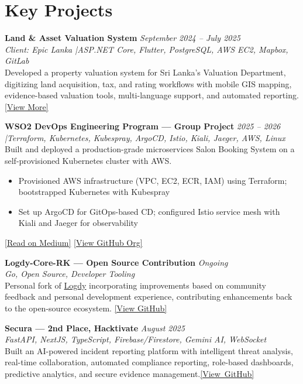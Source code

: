 \documentclass[a4paper,10pt]{article}
\newcommand{\projectsep}{\vspace{4pt}}
\newcommand{\project}[4]{%
  \noindent\textbf{#1} \hfill \textit{#2}\\[-2pt]
  \noindent\textcolor{accentblue}{\textit{#3}}\\[1pt]
  \noindent#4%
}
\begin{document}
\section{Key Projects}
\vspace{2pt}

\project{Land \& Asset Valuation System}{September 2024 -- July 2025}%
{Client: Epic Lanka \quad|\quad ASP.NET Core, Flutter, PostgreSQL, AWS EC2, Mapbox, GitLab}%
{Developed a property valuation system for Sri Lanka's Valuation Department, digitizing land acquisition, tax, and rating workflows with mobile GIS mapping, evidence-based valuation tools, multi-language support, and automated reporting.
\hfill \href{https://github.com}{[View More]}}

\projectsep
\project{WSO2 DevOps Engineering Program --- Group Project}{2025 -- 2026}%
{ \quad|\quad Terraform, Kubernetes, Kubespray, ArgoCD, Istio, Kiali, Jaeger, AWS, Linux}%
{ Built and deployed a production-grade microservices Salon Booking System on a self-provisioned Kubernetes cluster with AWS.}
\begin{itemize}
  \item Provisioned AWS infrastructure (VPC, EC2, ECR, IAM) using Terraform; bootstrapped Kubernetes with Kubespray
  \item Set up ArgoCD for GitOps-based CD; configured Istio service mesh with Kiali and Jaeger for observability
\end{itemize}
\hfill \href{https://medium.com/@ritharaedirisinghe/my-journey-through-the-wso2-linux-systems-administration-devops-engineering-training-f15e22af9246}{[Read on Medium]} \quad \href{https://github.com/orgs/WSO2-G02/repositories}{[View GitHub Org]}

\projectsep
\project{Logdy-Core-RK --- Open Source Contribution}{Ongoing}%
{Go, Open Source, Developer Tooling}%
{Personal fork of \href{https://logdy.dev}{Logdy} incorporating improvements based on community feedback and personal development experience, contributing enhancements back to the open-source ecosystem.
\hfill \href{https://github.com/rithakith/logdy-core-rk}{[View GitHub]}}

\projectsep
\project{Secura --- 2nd Place, Hacktivate}{August 2025}%
{FastAPI, NextJS, TypeScript, Firebase/Firestore, Gemini AI, WebSocket}%
{Built an AI-powered incident reporting platform with intelligent threat analysis, real-time collaboration, automated compliance reporting, role-based dashboards, predictive analytics, and secure evidence management.\hfill\mbox{\href{https://github.com/rithakith}{[View GitHub]}}}
\end{document}
